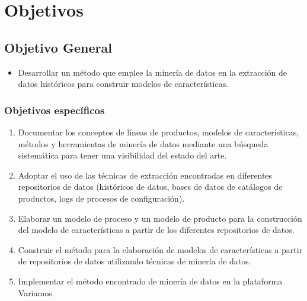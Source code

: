 \chapter{Objetivos}

\section{Objetivo General}
\begin{itemize}
\item Desarrollar un método que emplee la minería de datos en la extracción de datos históricos para construir modelos de características.
\end{itemize}

\subsection{Objetivos específicos}
\begin{enumerate}
\item Documentar los conceptos de líneas de productos, modelos de características, métodos y herramientas de minería de datos mediante una búsqueda sistemática para tener una visibilidad del estado del arte.
\item Adoptar el uso de las técnicas de extracción encontradas en diferentes repositorios de datos (históricos de datos, bases de datos de catálogos de productos, logs de procesos de configuración).
\item Elaborar un modelo de proceso y un modelo de producto para la construcción del modelo de características a partir de los diferentes repositorios de datos.
\item Construir el método para la elaboración de modelos de características a partir de repositorios de datos utilizando técnicas de minería de datos.
\item Implementar el método encontrado de minería de datos en la plataforma Variamos.
\end{enumerate}


